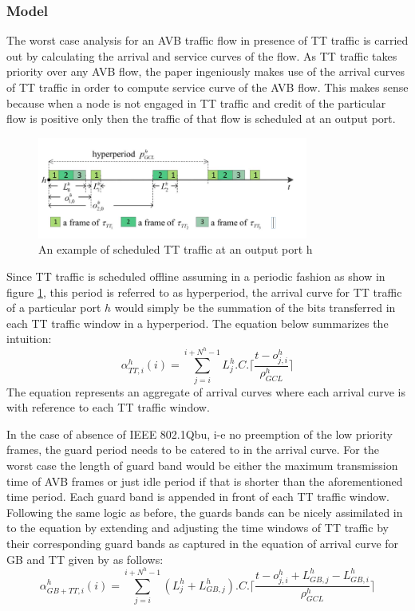 \documentclass[journal,12pt,twocolumn]{IEEEtran}
\begin{document}
\subsubsection {Model}
The worst case analysis for an AVB traffic flow in presence of TT traffic is carried out by calculating the arrival and service curves of the flow. As TT traffic takes priority over any AVB flow, the paper ingeniously makes use of the arrival curves of TT traffic in order to compute service curve of the AVB flow. This makes sense because when a node is not engaged in TT traffic and credit of the particular flow is positive only then the traffic of that flow is scheduled at an output port.
\begin{figure}
\centering
\includegraphics[width=3.5in]{NC_TT}
\caption{An example of scheduled TT traffic at an output port h }
\label{NC_TT}
\end{figure}
Since TT traffic is scheduled offline assuming in a periodic fashion as show in figure \ref{NC_TT}, this period is referred to as hyperperiod, the arrival curve for TT traffic of a particular port $h$ would simply be the summation of the bits transferred in each TT traffic window in a hyperperiod. The equation below summarizes the intuition:
\begin{equation}
\label{ttalpha}
\alpha^h_{TT,i}(i)=\sum_{j=i}^{i+N^h-1} L_j^h.C.\Bigg \lceil \frac{t-o_{j,i}^h}{\rho_{GCL}^h}\Bigg \rceil
\end{equation}
The equation represents an aggregate of arrival curves where each arrival curve is with reference to each TT traffic window.

In the case of absence of IEEE  802.1Qbu, i-e no preemption of the low priority frames, the guard period needs to be catered to in the arrival curve. For the worst case the length of guard band would be either the maximum transmission time of AVB frames or just idle period if that is shorter than the aforementioned time period. Each guard band is appended in front of each TT traffic window. Following the same logic as before, the guards bands can be nicely assimilated in to the equation by extending and adjusting the time windows of TT traffic by their corresponding guard bands as captured in the equation of arrival curve for GB and TT given by as follows:
\begingroup\makeatletter\def\f@size{8}\check@mathfonts
$$\alpha^h_{GB + TT,i}(i)=\sum_{j=i}^{i+N^h-1} (L_j^h+L_{GB,j}^h).C.\Bigg \lceil \frac{t-o_{j,i}^h+L_{GB,j}^h-L_{GB,i}^h}{\rho_{GCL}^h}\Bigg \rceil$$\endgroup
\end{document}
